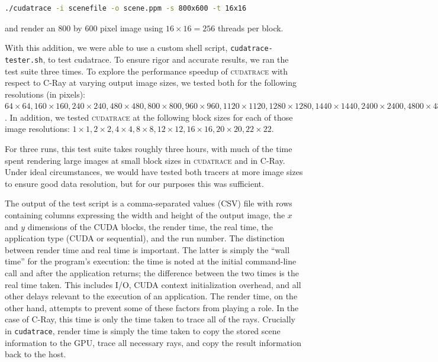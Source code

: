 \documentclass[12pt]{article}
\begin{document}
\begin{lstlisting}[language=bash]
    ./cudatrace -i scenefile -o scene.ppm -s 800x600 -t 16x16
\end{lstlisting}

and render an 800 by 600 pixel image using $16 \times 16 = 256$ threads per block.

With this addition, we were able to use a custom shell script, \texttt{cudatrace-tester.sh}, to test cudatrace. To ensure rigor and accurate results, we ran the test suite three times. To explore the performance speedup of \textsc{cudatrace} with respect to C-Ray at varying output image sizes, we tested both for the following resolutions (in pixels): $64 \times 64, 160\times160, 240\times240, 480\times480, 800\times800, 960\times960, 1120\times1120, 1280\times1280, 1440\times1440, 2400\times2400, 4800\times4800, 8000\times8000, 9600\times9600, 11200\times11200, 12800\times12800, 14400\times14400, and 16000\times16000$. In addition, we tested \textsc{cudatrace} at the following block sizes for each of those image resolutions: $1\times1, 2\times2, 4\times4, 8\times8, 12\times12, 16\times16, 20\times20, 22\times22$.

For three runs, this test suite takes roughly three hours, with much of the time spent rendering large images at small block sizes in \textsc{cudatrace} and in C-Ray. Under ideal circumstances, we would have tested both tracers at more image sizes to ensure good data resolution, but for our purposes this was sufficient.

The output of the test script is a comma-separated values (CSV) file with rows containing columns expressing the width and height of the output image, the $x$ and $y$ dimensions of the CUDA blocks, the render time, the real time, the application type (CUDA or sequential), and the run number. The distinction between render time and real time is important. The latter is simply the ``wall time'' for the program's execution: the time is noted at the initial command-line call and after the application returns; the difference between the two times is the real time taken. This includes I/O, CUDA context initialization overhead, and all other delays relevant to the execution of an application. The render time, on the other hand, attempts to prevent some of these factors from playing a role.  In the case of C-Ray, this time is only the time taken to trace all of the rays. Crucially in \texttt{cudatrace}, render time is simply the time taken to copy the stored scene information to the GPU, trace all necessary rays, and copy the result information back to the host.
\end{document}
